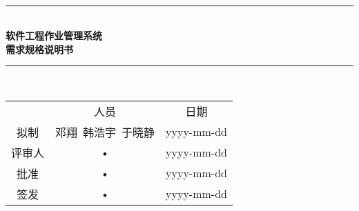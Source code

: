 \documentclass[bachelor]{ustcthesis}
\newcommand{\docname}{软件工程作业管理系统}
\newcommand{\HRule}{\rule{\linewidth}{0.5mm}}
\begin{document}
\begin{titlepage}
\begin{center}
~\\[5cm]
\HRule \\[0.4cm]
{\huge \bfseries \docname\\需求规格说明书}\\[0.4cm]
\HRule \\[1.5cm]

\begin{tabular}{ccc}
  & 人员 & 日期 \\
拟制 & 邓翔\ 韩浩宇\ 于晓静 & yyyy-mm-dd \\
评审人 & • & yyyy-mm-dd \\
批准 & • & yyyy-mm-dd \\
签发 & • & yyyy-mm-dd \\
\end{tabular}

\end{center}
\end{titlepage}



\frontmatter

\tableofcontents
\listoffigures
\listoftables
% 

\mainmatter









% 


\appendix


\end{document}
